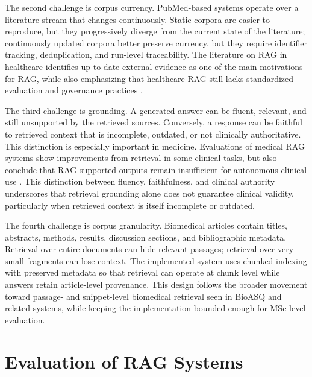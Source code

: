 The second challenge is corpus currency. PubMed-based systems operate over a literature stream that changes continuously. Static corpora are easier to reproduce, but they progressively diverge from the current state of the literature; continuously updated corpora better preserve currency, but they require identifier tracking, deduplication, and run-level traceability. The literature on RAG in healthcare identifies up-to-date external evidence as one of the main motivations for RAG, while also emphasizing that healthcare RAG still lacks standardized evaluation and governance practices \cite{amugongo2025healthcarerag}.

The third challenge is grounding. A generated answer can be fluent, relevant, and still unsupported by the retrieved sources. Conversely, a response can be faithful to retrieved context that is incomplete, outdated, or not clinically authoritative. This distinction is especially important in medicine. Evaluations of medical RAG systems show improvements from retrieval in some clinical tasks, but also conclude that RAG-supported outputs remain insufficient for autonomous clinical use \cite{malik2024anticoagulationrag}. This distinction between fluency, faithfulness, and clinical authority underscores that retrieval grounding alone does not guarantee clinical validity, particularly when retrieved context is itself incomplete or outdated.

The fourth challenge is corpus granularity. Biomedical articles contain titles, abstracts, methods, results, discussion sections, and bibliographic metadata. Retrieval over entire documents can hide relevant passages; retrieval over very small fragments can lose context. The implemented system uses chunked indexing with preserved metadata so that retrieval can operate at chunk level while answers retain article-level provenance. This design follows the broader movement toward passage- and snippet-level biomedical retrieval seen in BioASQ and related systems, while keeping the implementation bounded enough for MSc-level evaluation.

\section{Evaluation of RAG Systems}

